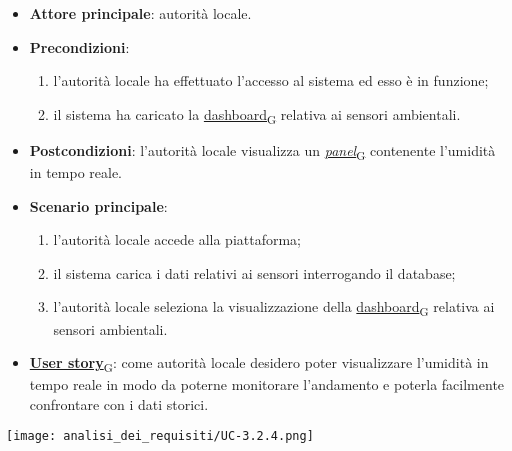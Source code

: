 \newpage
{}
\begin{itemize}
	\item \textbf{Attore principale}: autorità locale.
	\item \textbf{Precondizioni}:
	      \begin{enumerate}
		      \item l'autorità locale ha effettuato l'accesso al sistema ed esso è in funzione;
		      \item il sistema ha caricato la \href{https://7last.github.io/docs/pb/documentazione-interna/glossario\#dashboard}{dashboard\textsubscript{G}} relativa ai sensori ambientali.
	      \end{enumerate}
	\item \textbf{Postcondizioni}: l'autorità locale visualizza un \href{https://7last.github.io/docs/pb/documentazione-interna/glossario\#panel}{\textit{panel}\textsubscript{G}} contenente l'umidità in tempo reale.
	\item \textbf{Scenario principale}:
	      \begin{enumerate}
		      \item l'autorità locale accede alla piattaforma;
		      \item il sistema carica i dati relativi ai sensori interrogando il database;
		      \item l'autorità locale seleziona la visualizzazione della \href{https://7last.github.io/docs/pb/documentazione-interna/glossario\#dashboard}{dashboard\textsubscript{G}} relativa ai sensori ambientali.
	      \end{enumerate}
	\item \href{https://7last.github.io/docs/pb/documentazione-interna/glossario\#user-story}{\textbf{User story}\textsubscript{G}}:
	      come autorità locale desidero poter visualizzare l'umidità in tempo reale in modo da poterne monitorare l'andamento
	      e poterla facilmente confrontare con i dati storici.
\end{itemize}
\begin{center}
	\texttt{[image: analisi\_dei\_requisiti/UC-3.2.4.png]}
\end{center}

